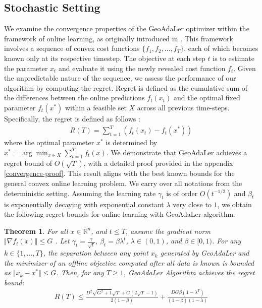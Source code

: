 \documentclass{article}
\newtheorem{theorem}{Theorem}
\begin{document}
\subsection{Stochastic Setting}
We examine the convergence properties of the GeoAdaLer optimizer within the framework of online learning, as originally introduced in \cite{zinkevich2003online}. This framework involves a sequence of convex cost functions $ \{f_1, f_2, \ldots, f_T\} $, each of which becomes known only at its respective timestep. The objective at each step $ t $ is to estimate the parameter $ x_t $ and evaluate it using the newly revealed cost function $ f_t $. Given the unpredictable nature of the sequence, we assess the performance of our algorithm by computing the regret. Regret is defined as the cumulative sum of the differences between the online predictions $ f_t(x_t) $ and the optimal fixed parameter $ f_t(x^*) $ within a feasible set $ X $ across all previous time-steps. Specifically, the regret is defined as follows \citep{zinkevich2003online,kingma2014adam}:
\begin{align}
R(T) = \sum_{t=1}^T \left(f_t(x_t) - f_t(x^*) \right)
\end{align}
where the optimal parameter $x^*$ is determined by $x^* = \arg\min_{x \in X} \sum_{t=1}^T f_t(x)$. We demonstrate that GeoAdaLer achieves a regret bound of $O(\sqrt{T})$, with a detailed proof provided in the appendix \ref{convergence-proof}. This result aligns with the best known bounds for the general convex online learning problem. We carry over all notations from the deterministic setting. Assuming the learning rate $\gamma_t$ is of order $O(t^{-1/2})$ and $\beta_t$ is exponentially decaying with exponential constant $\lambda$ very close to $1$, we obtain the following regret bounds for online learning with GeoAdaLer algorithm.


\begin{theorem}\label{geo-convergence}
For all \( x \in \mathbb{R}^n \), and $t \le T$, assume the gradient norm \(\Vert \nabla f_t(x)\Vert \leq G\) . Let \(\gamma_t = \frac{\gamma}{\sqrt{t}}\), \(\beta_t = \beta \lambda^t\), \(\lambda \in (0,1)\), and \(\beta \in [0,1)\). For any \( k \in \{1, \ldots, T\} \), the separation between any point \( x_k \) generated by GeoAdaLer and the minimizer of an offline objective computed after all data is known is bounded as \(\Vert x_k - x^*\Vert \leq G\). Then, for any \( T \geq 1 \), GeoAdaLer Algorithm achieves the regret bound:
\begin{align}\label{geo-bound}
R(T) \leq \frac{D^2 \sqrt{G^2 +1} \sqrt{T} + G  (2\sqrt{T}-1)}{2(1-\beta)} + \frac{D G \beta(1-\lambda^T)}{(1-\beta)(1-\lambda)}
\end{align}
\end{theorem}
\end{document}
